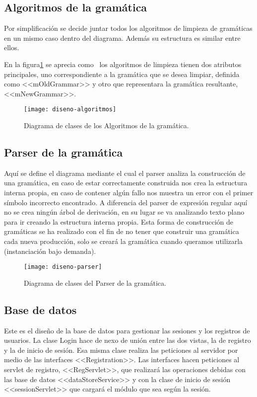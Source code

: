\subsection{Algoritmos de la gramática}

Por simplificación se decide juntar todos los algoritmos de limpieza de gramáticas en un mismo caso dentro del diagrama. Además su estructura es similar entre ellos.

En la figura\ref{fig:4.3} se aprecia como ~los algoritmos de limpieza tienen dos atributos principales, uno correspondiente a la gramática que se desea limpiar, definida como <<mOldGrammar>> y otro que representara la gramática resultante, <<mNewGrammar>>.

\begin{figure}[h]
\centering
\texttt{[image: diseno-algoritmos]}
\caption{Diagrama de clases de los Algoritmos de la gramática\cite{thothv2}.}
\label{fig:4.3}
\end{figure}

\subsection{Parser de la gramática}

Aquí se define el diagrama mediante el cual el parser analiza la construcción de una gramática, en caso de estar correctamente construida nos crea la estructura interna propia, en caso de contener algún fallo nos muestra un error con el primer símbolo incorrecto encontrado.
A diferencia del parser de expresión regular aquí no se crea ningún árbol de
derivación, en su lugar se va analizando texto plano para ir creando la estructura interna propia.
Esta forma de construcción de gramáticas se ha realizado con el fin de no tener que construir una gramática cada nueva producción, solo se creará la gramática cuando queramos utilizarla (instanciación bajo demanda).

\begin{figure}[h]
\centering
\texttt{[image: diseno-parser]}
\caption{Diagrama de clases del Parser de la gramática\cite{thothv2}.}
\label{fig:4.4}
\end{figure}



\subsection{Base de datos}

Este es el diseño de la base de datos para gestionar las sesiones y los registros de usuarios. La clase Login hace de nexo de unión entre las dos vistas, la de registro y la de inicio de sesión. Esa misma clase realiza las peticiones al servidor por medio de las interfaces <<Registration>>. Las interfaces hacen peticiones al servlet de registro, <<RegServlet>>, que realizará las operaciones debidas con las base de datos <<dataStoreService>> y con la clase de inicio de sesión <<sessionServlet>> que cargará el módulo que sea según la sesión.

